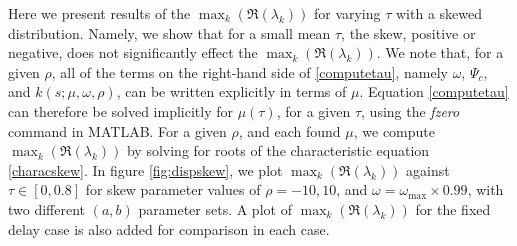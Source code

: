 Here we present results of the $\max_k(\Re(\lambda_k))$ for varying $\tau$ with a skewed distribution. Namely, we show that for a small mean $\tau$, the skew, positive or negative, does not significantly effect the $\max_k(\Re(\lambda_k))$. We note that, for a given $\rho$, all of the terms on the right-hand side of \eqref{computetau}, namely $\omega$, $\Psi_c$,  and $k(s;\mu,\omega,\rho)$, can be written explicitly in terms of $\mu$. Equation \eqref{computetau} can therefore be solved implicitly for $\mu(\tau)$, for a given $\tau$, using the \textit{fzero} command in MATLAB. For a given $\rho$, and each found $\mu$, we compute $\max_k(\Re(\lambda_k))$ by solving for roots of the characteristic equation \eqref{characskew}. In figure \ref{fig:dispskew}, we plot $\max_k(\Re(\lambda_k))$ against $\tau\in[0,0.8]$ for skew parameter values of $\rho=-10,10$, and $\omega=\omega_{\max}\times0.99$, with two different $(a,b)$ parameter sets. A plot of $\max_k(\Re(\lambda_k))$ for the fixed delay case is also added for comparison in each case.

